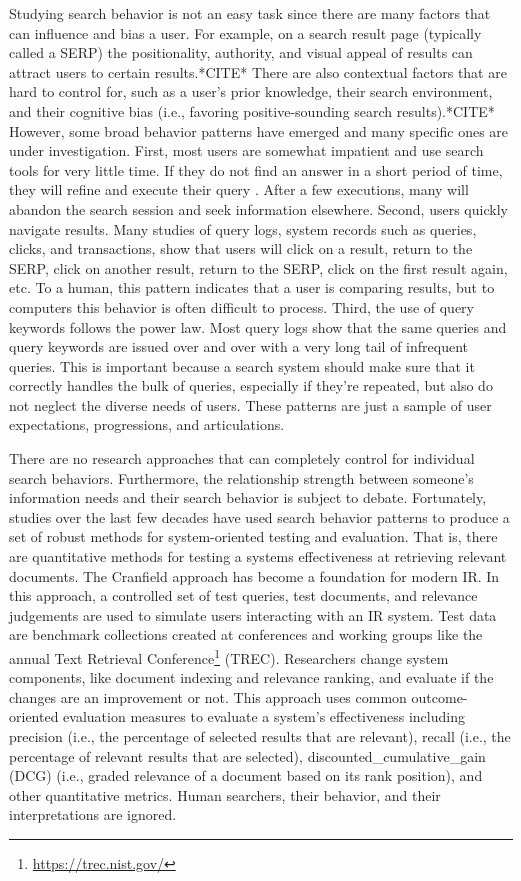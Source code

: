 Studying search behavior is not an easy task since there are many factors that can influence and bias a user. For example, on a search result page (typically called a \acrshort{SERP}) the positionality, authority, and visual appeal of results can attract users to certain results.*CITE* There are also contextual factors that are hard to control for, such as a user's prior knowledge, their search environment, and their cognitive bias (i.e., favoring positive-sounding search results).*CITE* However, some broad behavior patterns have emerged and many specific ones are under investigation. First, most users are somewhat impatient and use search tools for very little time. If they do not find an answer in a short period of time, they will refine and execute their query . After a few executions, many will abandon the search session and seek information elsewhere. Second, users quickly navigate results. Many studies of query logs, system records such as queries, clicks, and transactions, show that users will click on a result, return to the SERP, click on another result, return to the SERP, click on the first result again, etc. To a human, this pattern indicates that a user is comparing results, but to computers this behavior is often difficult to process. Third, the use of query keywords follows the power law. Most query logs show that the same queries and query keywords are issued over and over with a very long tail of infrequent queries. This is important because a search system should make sure that it correctly handles the bulk of queries, especially if they're repeated, but also do not neglect the diverse needs of users. These patterns are just a sample of user expectations, progressions, and articulations.

There are no research approaches that can completely control for individual search behaviors. Furthermore, the relationship strength between someone's information needs and their search behavior is subject to debate. Fortunately, studies over the last few decades have used search behavior patterns to produce a set of robust methods for system-oriented testing and evaluation. That is, there are quantitative methods for testing a systems effectiveness at retrieving relevant documents. The Cranfield approach has become a foundation for modern IR. In this approach, a controlled set of test queries, test documents, and relevance judgements are used to simulate users interacting with an IR system. Test data are benchmark collections created at conferences and working groups like the annual Text Retrieval Conference\footnote{\url{https://trec.nist.gov/}} (\acrshort{TREC}). Researchers change system components, like document indexing and relevance ranking, and evaluate if the changes are an improvement or not. This approach uses common outcome-oriented evaluation measures to evaluate a system's effectiveness including precision (i.e., the percentage of selected results that are relevant), recall (i.e., the percentage of relevant results that are selected), \gls{discounted_cumulative_gain} (\acrshort{DCG}) (i.e., graded relevance of a document based on its rank position), and other quantitative metrics. Human searchers, their behavior, and their interpretations are ignored.

